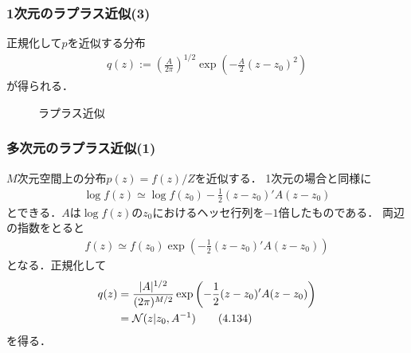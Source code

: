 \documentclass[10pt,%
hyperref={unicode}]{beamer}
\begin{document}
\begin{frame}
    \frametitle{1次元のラプラス近似(3)}
    正規化して$p$を近似する分布
    \begin{align}
        q(z) := \left(\frac{A}{2\pi}\right)^{1/2}\exp\left(-\frac{A}{2}(z - z_0)^2\right)
        \tag{4.130}
    \end{align}
    が得られる．

    \smallskip

    \begin{figure}
        \caption{ラプラス近似}
        \begin{center}
        \end{center}
    \end{figure}
\end{frame}

\begin{frame}
    \frametitle{多次元のラプラス近似(1)}
    $M$次元空間上の分布$p(z) = f(z)/Z$を近似する．
    1次元の場合と同様に
    \begin{align}
        \log f(z) \simeq \log f(z_0) - \frac{1}{2}(z-z_0)'A(z-z_0) \tag{4.131}
    \end{align}
    とできる．$A$は$\log f(z)$の$z_0$におけるヘッセ行列を$-1$倍したものである．
    両辺の指数をとると
    \begin{align}
        f(z) \simeq f(z_0)\exp\left(-\frac{1}{2}(z - z_0)'A(z - z_0) \right) \tag{4.133}
    \end{align}
    となる．正規化して
    \begin{align}
        q(z) &= \frac{|A|^{1/2}}%
        {(2\pi)^{M/2}}\exp\left(-\frac{1}{2}(z - z_0)'A(z - z_0)\right) \notag \\
        &= \mathcal{N}(z|z_0,A^{-1}) \tag{4.134}
    \end{align}
    を得る．
\end{frame}
\end{document}
